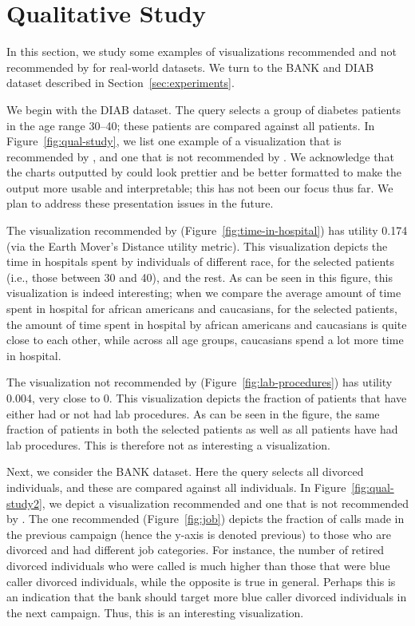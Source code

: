 
\section{Qualitative Study}\label{sec:example-viz}

In this section, we study some examples of visualizations recommended and
not recommended by \SeeDB for real-world datasets.
We turn to the BANK and DIAB dataset described in 
Section~\ref{sec:experiments}.
 
We begin with the DIAB dataset. The query selects a group of diabetes patients in the age range 30--40;
these patients are compared against all patients.
In Figure~\ref{fig:qual-study}, we list one example of a visualization
that is recommended by \SeeDB, and one that is not recommended by \SeeDB.
We acknowledge that the charts outputted by \SeeDB could look prettier and be better
formatted to make the output more usable and interpretable; this has not been our focus thus far. 
We plan to address these presentation issues in the future.

The visualization recommended by \SeeDB (Figure~\ref{fig:time-in-hospital}) has utility 0.174 (via
the Earth Mover's Distance utility metric).
This visualization depicts the time in hospitals spent by
individuals of different race, for the selected patients
(i.e., those between 30 and 40), and
the rest. 
As can be seen in this figure, this visualization is indeed interesting;
when we compare the average amount of time spent in hospital 
for african americans and caucasians, 
for the selected patients, the amount of time spent in hospital
by african americans and caucasians is quite close to each other,
while across all age groups, caucasians spend a lot more time
in hospital.

The visualization not recommended by \SeeDB (Figure~\ref{fig:lab-procedures}) has utility 0.004, very close to 0.
This visualization depicts the fraction of patients that 
have either had or not had lab procedures. 
As can be seen in the figure, the same fraction of patients in
both the selected patients as well as all patients
have had lab procedures.
This is therefore not as interesting a visualization.

Next, we consider the BANK dataset. 
Here the query selects all divorced individuals, 
and these are compared against all individuals. 
In Figure~\ref{fig:qual-study2}, we depict
a visualization recommended and one that is not recommended by \SeeDB.
The one recommended (Figure~\ref{fig:job}) depicts the fraction of calls made in the previous campaign (hence the y-axis is denoted previous) to those
who are divorced and had different job categories.
For instance, the number of retired divorced individuals who were called
is much higher than those that were blue caller divorced individuals,
while the opposite is true in general.
Perhaps this is an indication that the bank should target more blue caller divorced
individuals in the next campaign.
Thus, this is an interesting visualization.


